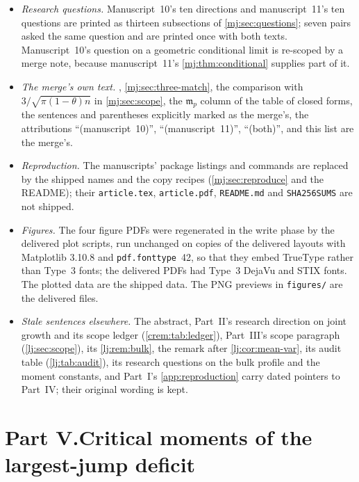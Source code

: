 \documentclass[11pt,a4paper]{article}
\theoremstyle{definition}\newaliascnt{definition}{theorem}
\theoremstyle{remark}\newaliascnt{remark}{theorem}
\begin{document}
\begin{itemize}
 citations are internal cross-references, including Part~III's
 Sections~\ref{mj:sec:lj-bulk} and~\ref{mj:sec:lj-moments}, whose headings
 received labels in the merge. Their entries for Nadler and Mayama--Akita are
 Part~I's.
\item \emph{Research questions.} Manuscript~10's ten directions and
 manuscript~11's ten questions are printed as thirteen subsections of
 \cref{mj:sec:questions}; seven pairs asked the same question and are printed
 once with both texts. Manuscript~10's question on a geometric conditional
 limit is re-scoped by a merge note, because manuscript~11's
 \cref{mj:thm:conditional} supplies part of it.
\item \emph{The merge's own text.} ,
 \cref{mj:sec:three-match}, the comparison with $3/\sqrt{\pi(1-\theta)n}$ in
 \cref{mj:sec:scope}, the $\mathfrak m_p$ column of the table of closed
 forms, the sentences and parentheses explicitly marked as the merge's, the
 attributions ``(manuscript~10)'', ``(manuscript~11)'', ``(both)'', and this
 list are the merge's.
\item \emph{Reproduction.} The manuscripts' package listings and commands are
 replaced by the shipped names and the copy recipes
 (\cref{mj:sec:reproduce} and the README); their \texttt{article.tex},
 \texttt{article.pdf}, \texttt{README.md} and \texttt{SHA256SUMS} are not
 shipped.
\item \emph{Figures.} The four figure PDFs were regenerated in the write
 phase by the delivered plot scripts, run unchanged on copies of the
 delivered layouts with Matplotlib 3.10.8 and \texttt{pdf.fonttype}~42, so
 that they embed TrueType rather than Type~3 fonts; the delivered PDFs had
 Type~3 DejaVu and STIX fonts. The plotted data are the shipped data. The PNG
 previews in \texttt{figures/} are the delivered files.
\item \emph{Stale sentences elsewhere.} The abstract, Part~II's research
 direction on joint growth and its scope ledger (\cref{crem:tab:ledger}),
 Part~III's scope paragraph
 (\cref{lj:sec:scope}), its \cref{lj:rem:bulk}, the remark after
 \cref{lj:cor:mean-var}, its audit table (\cref{lj:tab:audit}), its research
 questions on the bulk profile and the moment constants, and Part~I's
 \cref{app:reproduction} carry dated pointers to Part~IV; their original
 wording is kept.
\end{itemize}


\clearpage
{}\part*{Part V.\quad Critical moments of the largest-jump deficit}
\end{document}
